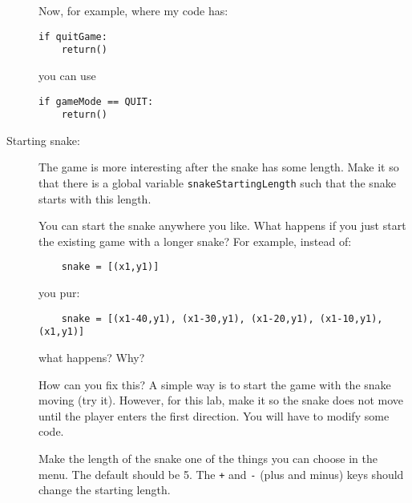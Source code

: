 \documentclass[12pt]{article}
\begin{document}
\begin{description}
Now, for example, where my code has:
\begin{lstlisting}
if quitGame:
    return()
\end{lstlisting}
you can use
\begin{lstlisting}
if gameMode == QUIT:
    return()
\end{lstlisting}


       

\item[Starting snake:]  The game is more interesting after the snake
has some length.  Make it so that there is a global variable 
\lstinline{snakeStartingLength}
such that the snake starts with this length.

You can start the snake anywhere you like.  What happens if you 
just start the existing game with a longer snake?  For example,
instead of:
\begin{lstlisting}
    snake = [(x1,y1)]
\end{lstlisting}
you pur:
\begin{lstlisting}
    snake = [(x1-40,y1), (x1-30,y1), (x1-20,y1), (x1-10,y1), (x1,y1)]
\end{lstlisting}
what happens?  Why?

How can you fix this?  A simple way is to start the game with the snake
moving (try it).  However, for this lab, make it so the snake does not move until
the player enters the first direction.  You will have to modify some code.

Make the length of the snake one of the things you can choose in the
menu.  The default should be 5.
  The \lstinline{+} and \lstinline{-} (plus and minus) keys should
change the starting length.



\end{description}
\end{document}
